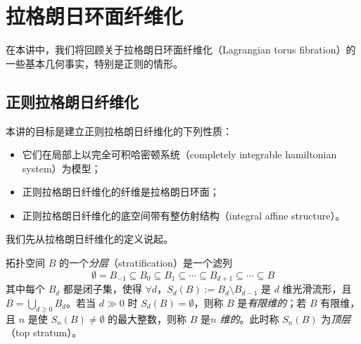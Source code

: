 
\section{拉格朗日环面纤维化}

在本讲中，我们将回顾关于拉格朗日环面纤维化（Lagrangian torus fibration）的一些基本几何事实，特别是正则的情形。

\subsection{正则拉格朗日纤维化}

本讲的目标是建立正则拉格朗日纤维化的下列性质：

\begin{itemize}[leftmargin=1.4em,itemsep=1pt,topsep=2pt]
  \item 它们在局部上以完全可积哈密顿系统（completely integrable hamiltonian system）为模型；
  \item 正则拉格朗日纤维化的纤维是拉格朗日环面；
  \item 正则拉格朗日纤维化的底空间带有整仿射结构（integral affine structure）。
\end{itemize}


我们先从拉格朗日纤维化的定义说起。

\begin{definition*}
拓扑空间 $B$ 的一个\emph{分层}（stratification）是一个滤列
\[
  \emptyset =B_{-1}\subseteq B_0\subseteq B_1\subseteq\dotsb\subseteq B_{d+1}\subseteq\dotsb\subseteq B
\]
其中每个 $B_d$ 都是闭子集，使得 $\forall d$，$S_d (B):= B_d\setminus B_{d-1}$ 是 $d$ 维光滑流形，且 $\displaystyle B=\bigcup_{d\geq 0} B_d$。若当 $d\gg 0$ 时 $S_d(B)=\emptyset$，则称 $B$ 是\emph{有限维的}；若 $B$ 有限维，且 $n$ 是使 $S_n (B)\neq\emptyset$ 的最大整数，则称 $B$ 是\emph{$n$ 维的}。此时称 $S_n(B)$ 为\emph{顶层}（top stratum）。
\end{definition*}


